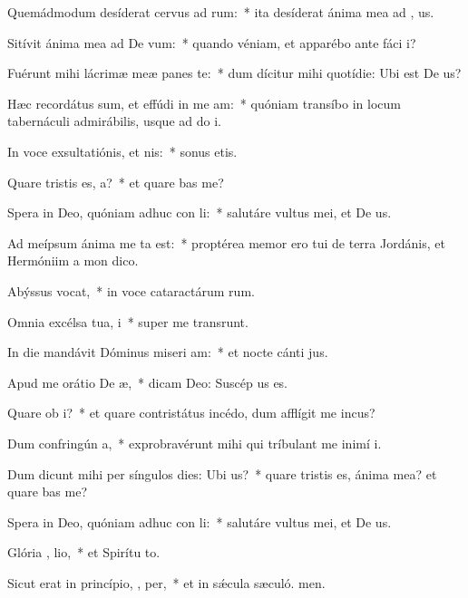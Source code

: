 \item Quemádmodum desíderat cervus ad  rum:~* ita desíderat ánima mea ad , us.
\item Sitívit ánima mea ad De  vum:~* quando véniam, et apparébo ante fáci i?
\item Fuérunt mihi lácrimæ meæ panes   te:~* dum dícitur mihi quotídie: Ubi est De us?
\item Hæc recordátus sum, et effúdi in me  am:~* quóniam transíbo in locum tabernáculi admirábilis, usque ad do i.
\item In voce exsultatiónis, et nis:~* sonus etis.
\item Quare tristis es,  a?~* et quare bas me?
\item Spera in Deo, quóniam adhuc con li:~* salutáre vultus mei, et De us.
\item Ad meípsum ánima me ta est:~* proptérea memor ero tui de terra Jordánis, et Hermóniim a mon dico.
\item Abýssus  vocat,~* in voce cataractárum rum.
\item Omnia excélsa tua,   i~* super me transrunt.
\item In die mandávit Dóminus miseri am:~* et nocte cánti jus.
\item Apud me orátio De  æ,~* dicam Deo: Suscép us es.
\item Quare ob  i?~* et quare contristátus incédo, dum afflígit me incus?
\item Dum confringún  a,~* exprobravérunt mihi qui tríbulant me inimí i.
\item Dum dicunt mihi per síngulos dies: Ubi   us?~* quare tristis es, ánima mea? et quare bas me?
\item Spera in Deo, quóniam adhuc con li:~* salutáre vultus mei, et De us.
\item Glória ,  lio,~* et Spirítu to.
\item Sicut erat in princípio,  ,  per,~* et in sǽcula sæculó. men.
